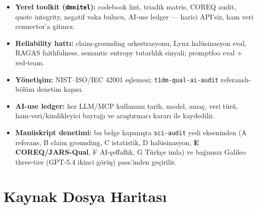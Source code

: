 \documentclass[
  turkish,
  a4paper,
  DIV=11,
  numbers=noendperiod]{scrreprt}
\providecommand{\tightlist}{%
  \setlength{\itemsep}{0pt}\setlength{\parskip}{0pt}}
\begin{document}
\begin{itemize}
\tightlist
\item
  \textbf{Yerel toolkit (\texttt{dmnitel}):} codebook lint, triadik
  matris, COREQ audit, quote integrity, negatif vaka bulucu, AI-use
  ledger --- harici API'siz, ham veri connector'a gitmez.
\item
  \textbf{Reliability hattı:} claim-grounding orkestrasyonu, Lynx
  halüsinasyon eval, RAGAS faithfulness, semantic entropy tutarlılık
  sinyali; promptfoo eval + red-team.
\item
  \textbf{Yönetişim:} NIST--ISO/IEC 42001 eşlemesi;
  \texttt{t1dm-qual-ai-audit} referanslı-bölüm denetim kapısı.
\item
  \textbf{AI-use ledger:} her LLM/MCP kullanımı tarih, model, amaç, veri
  türü, ham-veri/kimlikleyici bayrağı ve araştırmacı kararı ile
  kaydedilir.
\item
  \textbf{Manüskript denetimi:} bu belge kapanışta \texttt{sci-audit}
  yedi ekseninden (A referans, B claim grounding, C istatistik, D
  halüsinasyon, \textbf{E COREQ/JARS-Qual}, F AI-şeffaflık, G Türkçe
  imla) ve bağımsız Galileo three-tier (GPT-5.4 ikinci görüş) pass'inden
  geçirilir.
\end{itemize}

\chapter{Kaynak Dosya Haritası}\label{sec-kaynak-harita}
\end{document}

